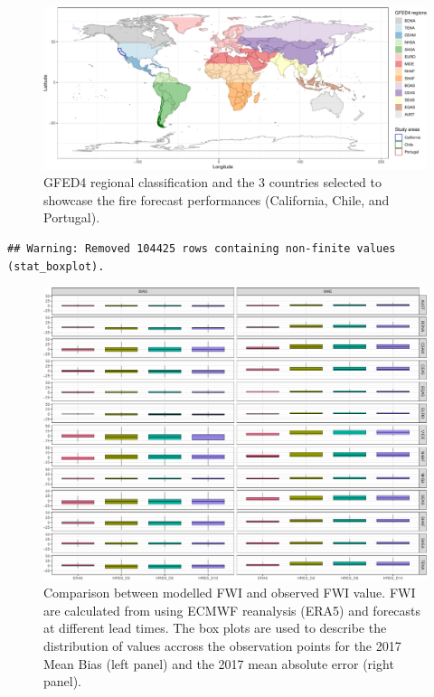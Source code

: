 \documentclass[, manuscript]{copernicus}
\begin{document}
\begin{figure}
\includegraphics[width=1\linewidth]{article_files/figure-latex/Figure1-1} \caption{\label{fig:Figure1}GFED4 regional classification and the 3 countries selected to showcase the fire forecast performances (California, Chile, and Portugal).}\label{fig:Figure1}
\end{figure}

\begin{verbatim}
## Warning: Removed 104425 rows containing non-finite values (stat_boxplot).
\end{verbatim}

\begin{figure}
\includegraphics[width=1\linewidth]{article_files/figure-latex/Figure2-1} \caption{\label{fig:Figure3}Comparison between modelled FWI and observed FWI value. FWI are calculated from using ECMWF reanalysis (ERA5) and forecasts at different lead times. The box plots are used to describe the distribution of values accross the observation points for the 2017 Mean Bias (left panel) and the 2017 mean absolute error (right panel).}\label{fig:Figure2}
\end{figure}
\end{document}
